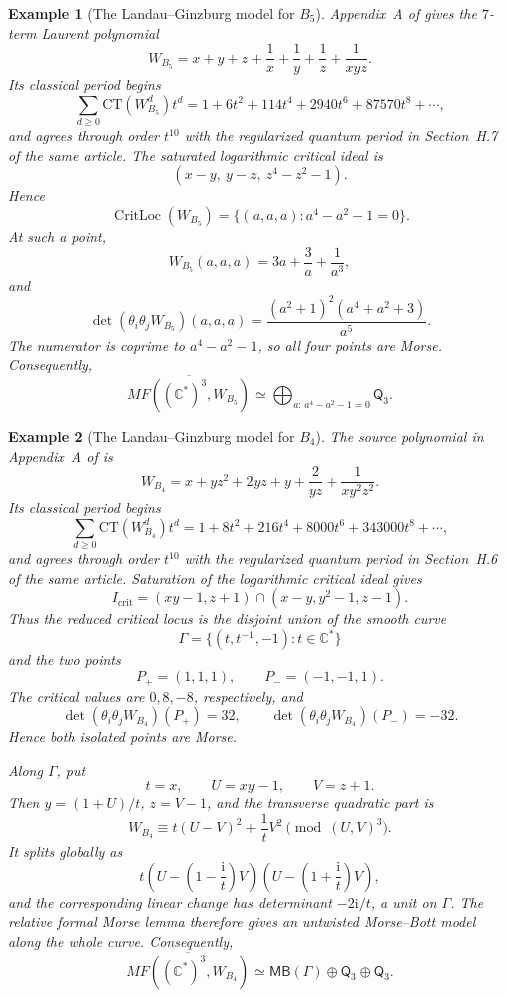 \documentclass[11pt]{amsart}
\newtheorem{example}{Example}[section]
\DeclareMathOperator{\CritLoc}{CritLoc}
\newcommand{\MorseCat}[1]{\mathsf{Q}_{#1}}
\newcommand{\MBcat}[1]{\mathsf{MB}(#1)}
\begin{document}
\begin{example}[The Landau--Ginzburg model for $B_5$]
Appendix~A of \cite{CoatesCortiGalkinKasprzyk2016} gives the $7$-term
Laurent polynomial
\[
W_{B_5}=x+y+z+\frac1x+\frac1y+\frac1z+\frac1{xyz}.
\]
Its classical period begins
\[
\sum_{d\geq0}\mathrm{CT}(W_{B_5}^d)t^d
=1+6t^2+114t^4+2940t^6+87570t^8+\cdots,
\]
and agrees through order $t^{10}$ with the regularized quantum period in
Section~H.7 of the same article.  The saturated logarithmic critical ideal is
\[
(x-y,\ y-z,\ z^4-z^2-1).
\]
Hence
\[
\CritLoc(W_{B_5})
=\{(a,a,a):a^4-a^2-1=0\}.
\]
At such a point,
\[
W_{B_5}(a,a,a)=3a+\frac3a+\frac1{a^3},
\]
and
\[
\det(\theta_i\theta_jW_{B_5})(a,a,a)
=\frac{(a^2+1)^2(a^4+a^2+3)}{a^5}.
\]
The numerator is coprime to $a^4-a^2-1$, so all four points are Morse.
Consequently,
\[
\overline{MF((\mathbb C^*)^3,W_{B_5})}
\simeq\bigoplus_{a:\,a^4-a^2-1=0}\MorseCat{3}.
\]
\end{example}

\begin{example}[The Landau--Ginzburg model for $B_4$]
The source polynomial in Appendix~A of
\cite{CoatesCortiGalkinKasprzyk2016} is
\[
W_{B_4}
=x+yz^2+2yz+y+\frac2{yz}+\frac1{xy^2z^2}.
\]
Its classical period begins
\[
\sum_{d\geq0}\mathrm{CT}(W_{B_4}^d)t^d
=1+8t^2+216t^4+8000t^6+343000t^8+\cdots,
\]
and agrees through order $t^{10}$ with the regularized quantum period in
Section~H.6 of the same article.  Saturation of the logarithmic critical ideal
gives
\[
I_{\mathrm{crit}}
=(xy-1,z+1)\cap(x-y,y^2-1,z-1).
\]
Thus the reduced critical locus is the disjoint union of the smooth curve
\[
\Gamma=\{(t,t^{-1},-1):t\in\mathbb C^*\}
\]
and the two points
\[
P_+=(1,1,1),
\qquad
P_-=(-1,-1,1).
\]
The critical values are $0,8,-8$, respectively, and
\[
\det(\theta_i\theta_jW_{B_4})(P_+)=32,
\qquad
\det(\theta_i\theta_jW_{B_4})(P_-)=-32.
\]
Hence both isolated points are Morse.

Along $\Gamma$, put
\[
t=x,
\qquad
U=xy-1,
\qquad
V=z+1.
\]
Then $y=(1+U)/t$, $z=V-1$, and the transverse quadratic part is
\[
W_{B_4}
\equiv
t(U-V)^2+\frac1tV^2
\pmod{(U,V)^3}.
\]
It splits globally as
\[
t\left(U-\left(1-\frac{\mathrm i}{t}\right)V\right)
 \left(U-\left(1+\frac{\mathrm i}{t}\right)V\right),
\]
and the corresponding linear change has determinant $-2\mathrm i/t$, a unit
on $\Gamma$.  The relative formal Morse lemma therefore gives an untwisted
Morse--Bott model along the whole curve. Consequently,
\[
\overline{MF((\mathbb C^*)^3,W_{B_4})}
\simeq
\MBcat{\Gamma}\oplus\MorseCat{3}\oplus\MorseCat{3}.
\]
\end{example}
\end{document}
